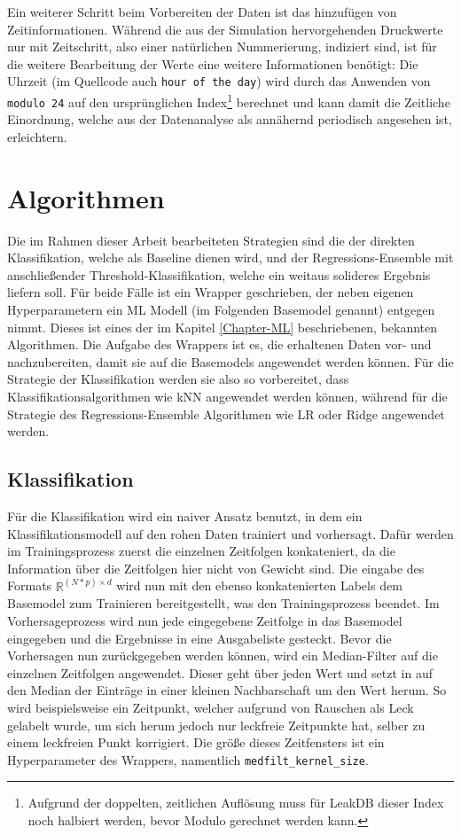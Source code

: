 Ein weiterer Schritt beim Vorbereiten der Daten ist das hinzufügen von Zeitinformationen. Während die aus der
 Simulation hervorgehenden Druckwerte nur mit Zeitschritt, also einer natürlichen Nummerierung, indiziert sind,
 ist für die weitere Bearbeitung der Werte eine weitere Informationen benötigt: Die Uhrzeit (im Quellcode auch
 \texttt{hour of the day}) wird durch das Anwenden von \texttt{modulo 24} auf den ursprünglichen
 Index\footnote{Aufgrund der doppelten, zeitlichen Auflösung muss für LeakDB dieser Index noch halbiert werden,
 bevor Modulo gerechnet werden kann.} berechnet und kann damit die Zeitliche Einordnung, welche aus der
 Datenanalyse als annähernd periodisch angesehen ist, erleichtern.


\section{Algorithmen}

Die im Rahmen dieser Arbeit bearbeiteten Strategien sind die der direkten Klassifikation, welche als Baseline
 dienen wird, und der Regressions-Ensemble mit anschließender Threshold-Klassifikation, welche ein weitaus
 solideres Ergebnis liefern soll. Für beide Fälle ist ein Wrapper geschrieben, der neben eigenen Hyperparametern
 ein ML Modell (im Folgenden Basemodel genannt) entgegen nimmt. Dieses ist eines der im Kapitel \ref{Chapter-ML}
 beschriebenen, bekannten Algorithmen. Die Aufgabe des Wrappers ist es, die erhaltenen Daten vor- und
 nachzubereiten, damit sie auf die Basemodels angewendet werden können. Für die Strategie der Klassifikation
 werden sie also so vorbereitet, dass Klassifikationsalgorithmen wie kNN angewendet werden können, während für
 die Strategie des Regressions-Ensemble Algorithmen wie LR oder Ridge angewendet werden.

\subsection*{Klassifikation}

Für die Klassifikation wird ein naiver Ansatz benutzt, in dem ein Klassifikationsmodell auf den rohen Daten
 trainiert und vorhersagt. Dafür werden im Trainingsprozess zuerst die einzelnen Zeitfolgen konkateniert, da
 die Information über die Zeitfolgen hier nicht von Gewicht sind. Die eingabe des Formats
 $\mathbb{R}^{(N*p) \times d}$ wird nun mit den ebenso konkatenierten Labels dem Basemodel zum Trainieren
 bereitgestellt, was den Trainingsprozess beendet. Im Vorhersageprozess wird nun jede eingegebene Zeitfolge
 in das Basemodel eingegeben und die Ergebnisse in eine Ausgabeliste gesteckt. Bevor die Vorhersagen nun
 zurückgegeben werden können, wird ein Median-Filter auf die einzelnen Zeitfolgen angewendet. Dieser geht
 über jeden Wert und setzt in auf den Median der Einträge in einer kleinen Nachbarschaft um den Wert herum.
 So wird beispielsweise ein Zeitpunkt, welcher aufgrund von Rauschen als Leck gelabelt wurde, um sich herum
 jedoch nur leckfreie Zeitpunkte hat, selber zu einem leckfreien Punkt korrigiert. Die größe dieses Zeitfensters
 ist ein Hyperparameter des Wrappers, namentlich \texttt{medfilt\_kernel\_size}.

